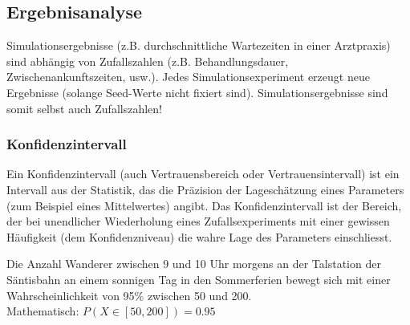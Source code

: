 \subsection{Ergebnisanalyse}
Simulationsergebnisse (z.B. durchschnittliche Wartezeiten in einer Arztpraxis) sind abhängig von Zufallszahlen (z.B. Behandlungsdauer, Zwischenankunftszeiten, usw.). Jedes Simulationsexperiment erzeugt neue Ergebnisse (solange Seed-Werte nicht fixiert sind). Simulationsergebnisse sind somit selbst auch Zufallszahlen!

\subsubsection{Konfidenzintervall}
Ein Konfidenzintervall (auch Vertrauensbereich oder Vertrauensintervall) ist ein Intervall aus der Statistik, das die Präzision der Lageschätzung eines Parameters (zum Beispiel eines Mittelwertes) angibt. Das Konfidenzintervall ist der Bereich, der bei unendlicher Wiederholung eines Zufallsexperiments mit einer gewissen Häufigkeit (dem Konfidenzniveau) die wahre Lage des Parameters einschliesst.
\begin{example}
	Die Anzahl Wanderer zwischen 9 und 10 Uhr morgens an der Talstation der Säntisbahn an einem sonnigen Tag in den Sommerferien bewegt sich mit einer Wahrscheinlichkeit von 95\% zwischen 50 und 200.\\
	Mathematisch: $P(X \in [50,200]) =  0.95$
\end{example}


